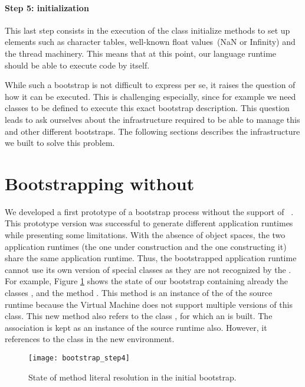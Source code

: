 \paragraph{\textbf{Step 5: initialization}}
This last step consists in the execution of the class initialize methods to set up elements such as character tables, well-known float values~(\eg NaN or Infinity) and the thread machinery. This means that at this point, our language runtime should be able to execute code by itself.
\newline

While such a bootstrap is not difficult to express per se, it raises the question of how it can be executed. This is challenging especially, since for example we need classes to be defined to execute this exact bootstrap description. This question leads to ask ourselves about the infrastructure required to be able to manage this and other different bootstraps. The following sections describes the infrastructure we built to solve this problem.

\section{Bootstrapping without \Vtt}\label{sec:bootstrapping_no_espell}

We developed a first prototype of a bootstrap process without the support of \Vtt~\cite{Poli14c}. This prototype version was successful to generate different application runtimes while presenting some limitations. With the absence of object spaces, the two application runtimes (the one under construction and the one constructing it) share the same application runtime. Thus, the bootstrapped application runtime cannot use its own version of special classes as they are not recognized by the \VM. For example, Figure \ref{fig:bootstrap_step4} shows the state of our bootstrap containing already the classes ,  and the method . This method is an instance of the  of the source runtime because the Virtual Machine does not support multiple versions of this class.
This new method also refers to the class , for which an  is built.
The association is kept as an instance of the source runtime also.
However, it references to the  class in the new environment.

\begin{figure}[ht]
\begin{center}
\texttt{[image: bootstrap\_step4]}
\caption{State of method literal resolution in the initial bootstrap.\label{fig:bootstrap_step4}}
\end{center}
\end{figure}

